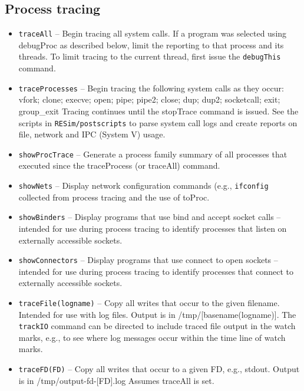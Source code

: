 \documentclass[titlepage]{article}
\begin{document}
\subsection{Process tracing}
\label{process_tracing}
\begin{itemize}
\item {\tt traceAll} – Begin tracing all system calls.  If a program was selected using debugProc as described below, limit the reporting to that process and its threads.  
To limit tracing to the current thread, first issue the {\tt debugThis} command.
\item {\tt traceProcesses} – Begin tracing the following system calls as they occur:
vfork; clone; execve;  open; pipe; pipe2; close; dup; dup2; socketcall; exit; group\_exit
Tracing continues until the stopTrace command is issued.  
See the scripts in {\tt RESim/postscripts} to parse system call logs and create reports on file, network and IPC (System V) usage.

\item {\tt showProcTrace} – Generate a process family summary of all processes that executed since the traceProcess (or traceAll) command.

\item {\tt showNets} – Display network configuration commands (e.g., {\tt ifconfig} collected from process tracing and the use of toProc.

\item {\tt showBinders} – Display programs that use bind and accept socket calls – intended for use during process tracing to identify processes that listen on externally accessible sockets.

\item {\tt showConnectors} – Display programs that use connect to open sockets – intended for use during process tracing to identify processes that connect to externally accessible sockets.

\item {\tt traceFile(logname)} – Copy all writes that occur to the given filename.  Intended for use with log files.  Output is in /tmp/[basename(logname)].
The {\tt trackIO} command can be directed to include traced file output in the watch marks, e.g., to see where log messages occur within the
time line of watch marks.

\item {\tt traceFD(FD)} – Copy all writes that occur to a given FD, e.g., stdout.  Output is in /tmp/output-fd-[FD].log   Assumes traceAll is set.


\end{itemize}
\end{document}
